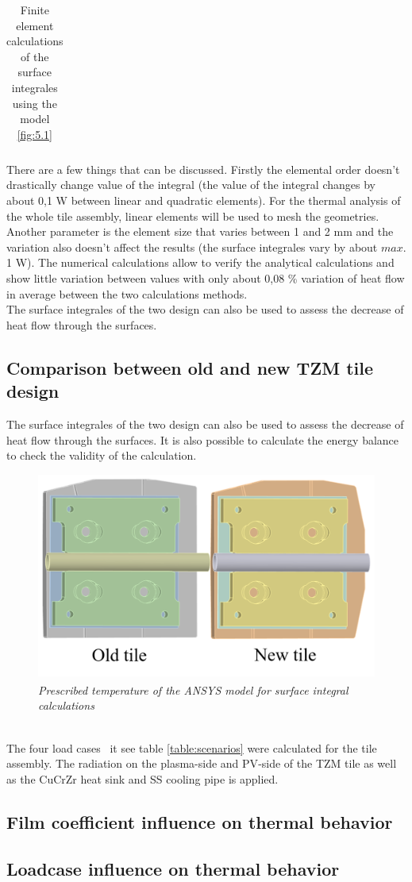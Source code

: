 \begin{table}[h!]
\begin{tabular}{p{}p{}p{}p{}p{}p{} }
    \bottomrule
\end{tabular}
\caption{Finite element calculations of the surface integrales using the model \ref{fig:5.1}}
\end{table}

\normalsize{\indent There are a few things that can be discussed. Firstly the elemental order doesn't drastically change value of the integral (the value of the integral changes by about 0,1 \unit{W} between linear and quadratic elements). For the thermal analysis of the whole tile assembly, linear elements will be used to mesh the geometries. Another parameter is the element size that varies between 1 and 2 \unit{mm} and the variation also doesn't affect the results (the surface integrales vary by about $max.$ 1 \unit{W}). The numerical calculations allow to verify the analytical calculations and show little variation between values with only about 0,08 \% variation of heat flow in average between the two calculations methods.}
\\
\break
\normalsize{\indent The surface integrales of the two design can also be used to assess the decrease of heat flow through the surfaces.}

\subsection{Comparison between old and new TZM tile design}
\normalsize{The surface integrales of the two design can also be used to assess the decrease of heat flow through the surfaces. It is also possible to calculate the energy balance to check the validity of the calculation.}
\\
\begin{figure}[h!]
    \label{fig_5_3} 
    \centering
    \includegraphics[width=.51\textwidth]{figures/energybalancemodel.png}
    \caption{\it Prescribed temperature of the ANSYS\textsuperscript{\textregistered} model for surface integral calculations}
\end{figure}
\\
\normalsize{\indent The four load cases {\ it see table \ref{table:scenarios}} were calculated for the tile assembly. The radiation on the plasma-side and \acrshort{PV}-side of the \acrshort{TZM} tile as well as the \acrshort{CuCrZr} heat sink and \acrshort{SS} cooling pipe is applied.}
\subsection{Film coefficient influence on thermal behavior}
\subsection{Loadcase influence on thermal behavior}